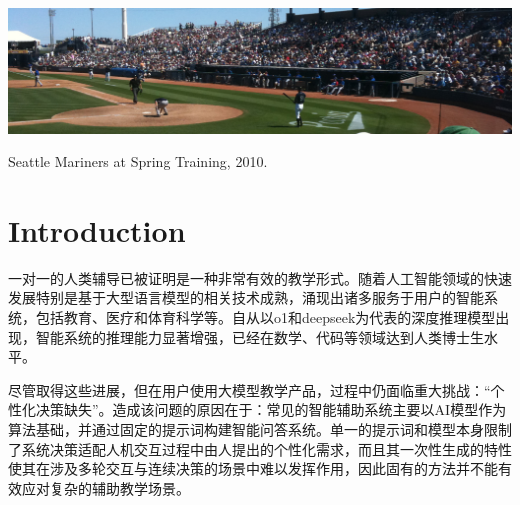 \documentclass[sigconf]{acmart}
\begin{document}

\begin{teaserfigure}
  \includegraphics[width=\textwidth]{sampleteaser}
  \caption{Seattle Mariners at Spring Training, 2010.}
  \label{fig:teaser}
\end{teaserfigure}


\maketitle

\section{Introduction}
一对一的人类辅导已被证明是一种非常有效的教学形式\cite{chiLearningHumanTutoring2001}。随着人工智能领域的快速发展特别是基于大型语言模型的相关技术成熟，涌现出诸多服务于用户的智能系统，包括教育\cite{wangLargeLanguageModels2024}、医疗\cite{heSurveyLargeLanguage2025}和体育科学\cite{connorLargeLanguageModels2023}等。自从以o1\cite{openaiOpenAIO1System2024a}和deepseek\cite{deepseek-aiDeepSeekR1IncentivizingReasoning2025b}为代表的深度推理模型出现，智能系统的推理能力显著增强，已经在数学\cite{chenDeepMathCreativeBenchmarkEvaluating2025}、代码\cite{jainLiveCodeBenchHolisticContamination2024}等领域达到人类博士生水平。

尽管取得这些进展，但在用户使用大模型教学产品，过程中仍面临重大挑战：“个性化决策缺失”。造成该问题的原因在于：常见的智能辅助系统主要以AI模型作为算法基础，并通过固定的提示词构建智能问答系统\cite{goldbachIntelligentTutoringSystems2020,kwonBIPEDPedagogicallyInformed2024}。单一的提示词和模型本身限制了系统决策适配人机交互过程中由人提出的个性化需求，而且其一次性生成的特性使其在涉及多轮交互与连续决策的场景中难以发挥作用，因此固有的方法并不能有效应对复杂的辅助教学场景。
\end{document}
